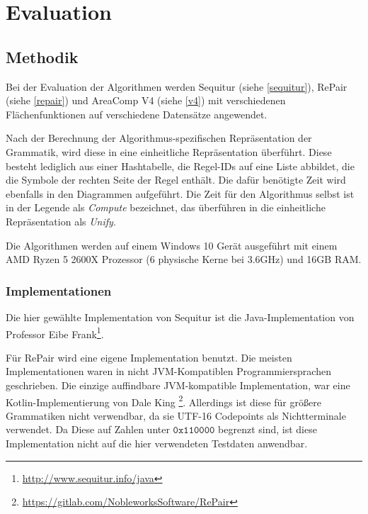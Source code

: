 
\chapter{Evaluation}

\section{Methodik}

Bei der Evaluation der Algorithmen werden Sequitur (siehe \autoref{sequitur}), RePair (siehe \autoref{repair}) und AreaComp V4 (siehe \autoref{v4}) mit verschiedenen Flächenfunktionen auf verschiedene Datensätze angewendet. 

Nach der Berechnung der Algorithmus-spezifischen Repräsentation der Grammatik, wird diese in eine einheitliche Repräsentation überführt. Diese besteht lediglich aus einer Hashtabelle, die Regel-IDs auf eine Liste abbildet, die die Symbole der rechten Seite der Regel enthält. Die dafür benötigte Zeit wird ebenfalls in den Diagrammen aufgeführt. Die Zeit für den Algorithmus selbst ist in der Legende als \emph{Compute} bezeichnet, das überführen in die einheitliche Repräsentation als \emph{Unify}.

Die Algorithmen werden auf einem Windows 10 Gerät ausgeführt mit einem AMD Ryzen 5 2600X Prozessor (6 physische Kerne bei 3.6GHz) und 16GB RAM.

\subsection{Implementationen}

Die hier gewählte Implementation von Sequitur ist die Java-Implementation von Professor Eibe Frank\footnote{\url{http://www.sequitur.info/java}}. 

Für RePair wird eine eigene Implementation benutzt. Die meisten Implementationen waren in nicht JVM-Kompatiblen Programmiersprachen geschrieben. 
Die einzige auffindbare JVM-kompatible Implementation, war eine Kotlin-Implementierung von Dale King \footnote{\url{https://gitlab.com/NobleworksSoftware/RePair}}. Allerdings ist diese für größere Grammatiken nicht verwendbar, da sie UTF-16 Codepoints als Nichtterminale verwendet. Da Diese auf Zahlen unter $\mathtt{0x110000}$ begrenzt sind, ist diese Implementation nicht auf die hier verwendeten Testdaten anwendbar.

